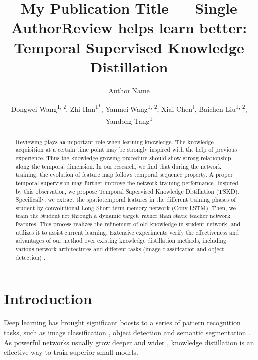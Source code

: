 \documentclass[letterpaper]{article} %
\title{My Publication Title --- Single Author}
\author {
    Author Name
}
\title{Review helps learn better: Temporal Supervised Knowledge Distillation}
\author {
    Dongwei Wang\textsuperscript{\rm 1, 2},
    Zhi Han\textsuperscript{\rm 1*},
    Yanmei Wang\textsuperscript{\rm 1, 2},
    Xiai Chen\textsuperscript{\rm 1},
    Baichen Liu\textsuperscript{\rm 1, 2},
    Yandong Tang\textsuperscript{\rm 1}
}
\begin{document}
\maketitle

\begin{abstract}
Reviewing plays an important role when learning knowledge. The knowledge acquisition at a certain time point may be strongly inspired with the help of previous experience. Thus the knowledge growing procedure should show strong relationship along the temporal dimension.
        In our research, we find that during the network training, the evolution of feature map follows temporal sequence property. A proper temporal supervision may further improve the network training performance.
        Inspired by this observation, we propose Temporal Supervised Knowledge Distillation (TSKD). Specifically, we extract the spatiotemporal features in the different training phases of student by convolutional Long Short-term memory network (Conv-LSTM). Then, we train the student net through a dynamic target, rather than static teacher network features. This process realizes the refinement of old knowledge in student network, and utilizes it to assist current learning.
        Extensive experiments verify the effectiveness and advantages of our method over existing knowledge distillation methods, including various network architectures and different tasks (image classification and object detection) .
\end{abstract}

\section{Introduction}

Deep learning \cite{lecun2015deep} has brought significant boosts to a series of pattern recognition tasks, such as image classification \cite{simonyan2014very,krizhevsky2017imagenet,you2020greedynas,zhang2018shufflenet}, object detection \cite{girshick2015fast,redmon2016you,he2017mask} and semantic segmentation \cite{zhao2017pyramid,chen2017rethinking}. As powerful networks usually grow deeper and wider \cite{xie2017aggregated,dosovitskiy2020image}, knowledge distillation is an effective way to train superior small models.
\end{document}
